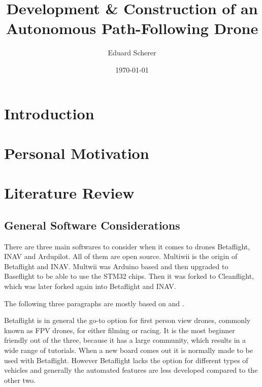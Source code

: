 \documentclass{article}
\author{Eduard Scherer}
\title{Development \& Construction of an Autonomous Path-Following Drone}
\date{\today}
\begin{document}
\maketitle
\tableofcontents
\pagebreak

	\section{Introduction}
	

	\section{Personal Motivation}
	\section{Literature Review}
	\subsection{General Software Considerations}
	
	There are three main softwares to consider when it comes to drones Betaflight, INAV and Ardupilot. All of them are open source. Multiwii is the origin of Betaflight and INAV. Multwii was Arduino based and then upgraded to Baseflight to be able to use the STM32 chips. Then it was forked to Cleanflight, which was later forked again into Betaflight and INAV\cite{history}. 
	
	The following three paragraphs are mostly based on \cite{firmwarearticle} and \cite{firmwarevideo}.
	
	Betaflight is in general the go-to option for first person view drones, commonly known as FPV drones, for either filming or racing. It is the most beginner friendly out of the three, because it has a large community, which results in a wide range of tutorials. When a new board comes out it is normally made to be used with Betaflight. However Betaflight lacks the option for different types of vehicles and generally the automated features are less developed compared to the other two. 
	
\end{document}
